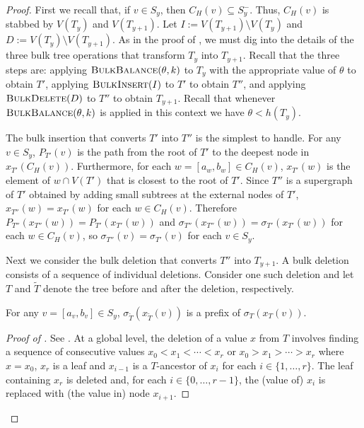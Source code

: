 \documentclass[kpfonts]{patmorin}
\newcommand{\snote}[1]{\fcolorbox{red}{yellow}{#1}}
\begin{document}
\begin{proof}
  First we recall that, if $v\in S_y$, 
  then $C_H(v) \subseteq S^-_y$. 
  Thus, $C_H(v)$ is stabbed by $V(T_y)$ and $V(T_{y+1})$.
  Let $I:=V(T_{y+1})\setminus V(T_{y})$ and $D:=V(T_y)\setminus V(T_{y+1})$.
  As in the proof of , we must dig into the details of the three bulk tree operations that transform $T_y$ into $T_{y+1}$. 
  Recall that the three steps are: 
  applying $\textsc{BulkBalance}(\theta,k)$ to $T_y$ with the appropriate value of $\theta$ to obtain $T'$,
  applying $\textsc{BulkInsert}(I)$ to $T'$ to obtain $T''$, and
  applying $\textsc{BulkDelete}(D)$ to $T''$ to obtain $T_{y+1}$.
  Recall that whenever $\textsc{BulkBalance}(\theta,k)$ is applied in this context we have $\theta < h(T_y)$.



  The bulk insertion that converts $T'$ into $T''$ is the simplest to handle.  For any $v\in S_y$, $P_{T'}(v)$ is the path from the root of $T'$ to the deepest node in $x_{T'}(C_H(v))$.  Furthermore, for each $w=[a_w,b_w]\in C_H(v)$, $x_{T'}(w)$ is the element of $w\cap V(T')$ that is closest to the root of $T'$. Since $T''$ is a supergraph of $T'$ obtained by adding small subtrees at the external nodes of $T'$, $x_{T''}(w)=x_{T'}(w)$ for each $w\in C_H(v)$.  Therefore $P_{T''}(x_{T''}(w))=P_{T'}(x_{T'}(w))$ and $\sigma_{T''}(x_{T''}(w))=\sigma_{T'}(x_{T'}(w))$ for each $w\in C_H(v)$, so $\sigma_{T''}(v)=\sigma_{T'}(v)$ for each $v\in S_y$.

  Next we consider the bulk deletion that converts $T''$ into $T_{y+1}$.  A bulk deletion consists of a sequence of individual deletions. Consider one such deletion and let $T$ and $\tilde{T}$ denote the tree before and after the deletion, respectively.

  \begin{clm}
    For any $v=[a_v,b_v]\in S_y$, $\sigma_{\tilde{T}}(x_{\tilde{T}}(v))$ is a prefix of $\sigma_T(x_T(v))$.
  \end{clm}

  \begin{proof}[Proof of ]
    See .  At a global level, the deletion of a value $x$ from $T$ involves finding a sequence of consecutive values $x_0<x_1<\cdots<x_r$ or $x_0>x_1>\cdots>x_r$ where $x=x_0$, $x_r$ is a leaf and $x_{i-1}$ is a $T$-ancestor of $x_{i}$ for each $i\in\{1,\ldots,r\}$.  The leaf containing $x_r$ is deleted and, for each $i\in\{0,\ldots,r-1\}$, the (value of) $x_i$ is replaced with (the value in) node $x_{i+1}$.


\end{proof}
\end{proof}
\end{document}
